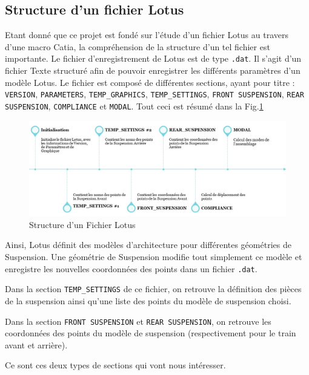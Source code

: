 \subsection{Structure d'un fichier Lotus} %
\par Etant donné que ce projet est fondé sur l'étude d'un fichier Lotus au travers d'une macro Catia, la compréhension de la structure d'un tel fichier est importante.
Le fichier d'enregistrement de Lotus est de type \texttt{.dat}. Il s'agit d'un fichier Texte structuré afin de pouvoir enregistrer les différents paramètres d'un modèle Lotus. Le fichier est composé de différentes sections, ayant pour titre : \texttt{VERSION}, \texttt{PARAMETERS}, \texttt{TEMP\_GRAPHICS}, \texttt{TEMP\_SETTINGS}, \texttt{FRONT SUSPENSION}, \texttt{REAR SUSPENSION},
\texttt{COMPLIANCE} et
\texttt{MODAL}. Tout ceci est résumé dans la Fig.\ref{fig:structure_lotus}

\begin{figure}
    \centering
    \includegraphics[width=\linewidth]{img/Structure_Fichier_Lotus.jpg}
    \caption{Structure d'un Fichier Lotus}
    \label{fig:structure_lotus}
\end{figure}

\newpage
\par Ainsi, Lotus définit des modèles d'architecture pour différentes géométries de Suspension. Une géométrie de Suspension modifie tout simplement ce modèle et enregistre les nouvelles coordonnées des points dans un fichier \texttt{.dat}. \par Dans la section \texttt{TEMP\_SETTINGS} de ce fichier, on retrouve la définition des pièces de la suspension ainsi qu'une liste des points du modèle de suspension choisi.
\par Dans la section \texttt{FRONT SUSPENSION} et \texttt{REAR SUSPENSION}, on retrouve les coordonnées des points du modèle de suspension (respectivement pour le train avant et arrière).
\par Ce sont ces deux types de sections qui vont nous intéresser.


